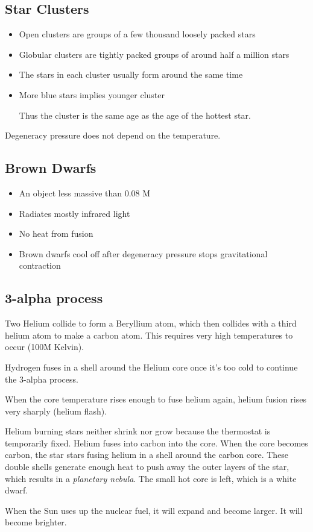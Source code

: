 \documentclass[class=article, crop=false]{standalone}
\begin{document}
  \subsection{Star Clusters}
  \begin{itemize}
    \item Open clusters are groups of a few thousand loosely packed stars
    \item Globular clusters are tightly packed groups of around half a million stars
    \item The stars in each cluster usually form around the same time
    \item More blue stars implies younger cluster
    \begin{note}{}
      Thus the cluster is the same age as the age of the hottest star.
    \end{note}
  \end{itemize}
  Degeneracy pressure does not depend on the temperature.
  \subsection{Brown Dwarfs}
  \begin{itemize}
    \item An object less massive than $0.08$ M
    \item Radiates mostly infrared light
    \item No heat from fusion
    \item Brown dwarfs cool off after degeneracy pressure stops gravitational contraction
  \end{itemize}
  \subsection{3-alpha process}
  Two Helium collide to form a Beryllium atom, which then collides with a third helium atom to make a carbon atom. This requires very high temperatures to occur (100M Kelvin). \par
  Hydrogen fuses in a shell around the Helium core once it's too cold to continue the 3-alpha process. \par
  When the core temperature rises enough to fuse helium again, helium fusion rises very sharply (helium flash). \par
  Helium burning stars neither shrink nor grow because the thermostat is temporarily fixed. Helium fuses into carbon into the core. When the core becomes carbon, the star stars fusing helium in a shell around the carbon core. These double shells generate enough heat to push away the outer layers of the star, which results in a \emph{planetary nebula}. The small hot core is left, which is a white dwarf.
  \begin{note}{}
    When the Sun uses up the nuclear fuel, it will expand and become larger. It will become brighter.
  \end{note}
\end{document}
